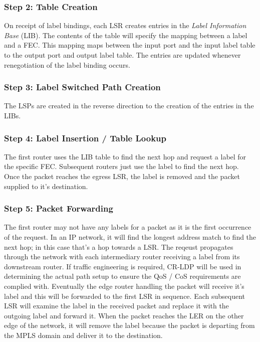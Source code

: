 \subsubsection{Step 2: Table Creation}
On receipt of label bindings, each LSR creates entries in the \textit{Label Information Base} (LIB). The contents of the table will specify the mapping between a label and a FEC. This mapping maps between the input port and the input label table to the output port and output label table. The entries are updated whenever renegotiation of the label binding occurs.

\subsubsection{Step 3: Label Switched Path Creation}
The LSPs are created in the reverse direction to the creation of the entries in the LIBs.

\subsubsection{Step 4: Label Insertion / Table Lookup}
The first router uses the LIB table to find the next hop and request a label for the specific FEC. Subsequent routers just use the label to find the next hop. Once the packet reaches the egress LSR, the label is removed and the packet supplied to it's destination.

\subsubsection{Step 5: Packet Forwarding}
The first router may not have any labels for a packet as it is the first occurrence of the request. In an IP network, it will find the longest address match to find the next hop; in this case that's a hop towards a LSR. The reqeust propagates through the network with each intermediary router receiving a label from its downstream router. If traffic engineering is required, CR-LDP will be used in determining the actual path setup to ensure the QoS / CoS requirements are complied with. Eventually the edge router handling the packet will receive it's label and this will be forwarded to the first LSR in sequence. Each subsequent LSR will examine the label in the received packet and replace it with the outgoing label and forward it. When the packet reaches the LER on the other edge of the network, it will remove the label because the packet is departing from the MPLS domain and deliver it to the destination. 

